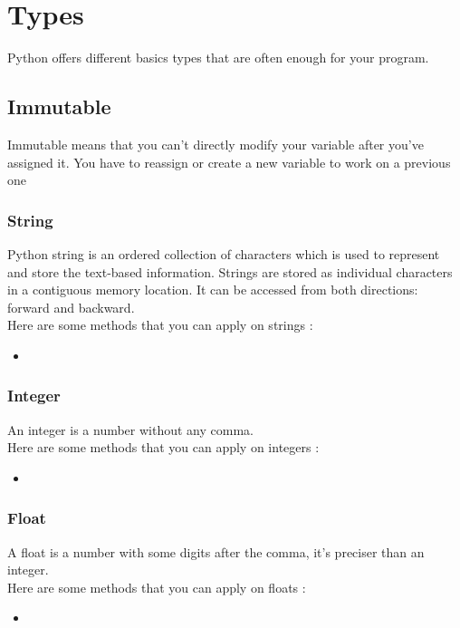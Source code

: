 \documentclass[a4paper, 12pt]{article}
\begin{document}
\clearpage
\section{Types}
Python offers different basics types that are often enough for your program.\newline

\subsection{Immutable}
Immutable means that you can't directly modify your variable after you've assigned it. You have to reassign or create a new variable to work on a previous one\newline

\subsubsection{String}
Python string is an ordered collection of characters which is used to represent and store the text-based information. Strings are stored as individual characters in a contiguous memory location. It can be accessed from both directions: forward and backward. \\
Here are some methods that you can apply on strings : 
\begin{itemize}
\item
\end{itemize}

\subsubsection{Integer}
An integer is a number without any comma. \\
Here are some methods that you can apply on integers : 
\begin{itemize}
\item
\end{itemize}

\subsubsection{Float}
A float is a number with some digits after the comma, it's preciser than an integer. \\
Here are some methods that you can apply on floats : 
\begin{itemize}
\item
\end{itemize}
\end{document}
